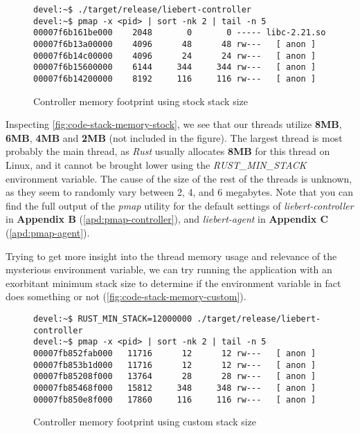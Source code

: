            \begin{figure}[!htb]
                \centering
                \begin{BVerbatim}
devel:~$ ./target/release/liebert-controller
devel:~$ pmap -x <pid> | sort -nk 2 | tail -n 5
00007f6b161be000    2048       0       0 ----- libc-2.21.so
00007f6b13a00000    4096      48      48 rw---   [ anon ]
00007f6b14c00000    4096      24      24 rw---   [ anon ]
00007f6b15600000    6144     344     344 rw---   [ anon ]
00007f6b14200000    8192     116     116 rw---   [ anon ]
                \end{BVerbatim}
                \caption{Controller memory footprint using stock stack size}
                \label{fig:code-stack-memory-stock}
            \end{figure}
            
            Inspecting \autoref{fig:code-stack-memory-stock}, we see that our threads utilize \textbf{8MB}, \textbf{6MB}, \textbf{4MB} and \textbf{2MB} (not included in the figure). The largest thread is most probably the main thread, as \textit{Rust} usually allocates \textbf{8MB} for this thread on Linux, and it cannot be brought lower using the \textit{RUST\_MIN\_STACK} environment variable. The cause of the size of the rest of the threads is unknown, as they seem to randomly vary between 2, 4, and 6 megabytes. Note that you can find the full output of the \textit{pmap} utility for the default settings of \textit{liebert-controller} in \textbf{Appendix B} (\autoref{apd:pmap-controller}), and \textit{liebert-agent} in \textbf{Appendix C} (\autoref{apd:pmap-agent}).
            
            Trying to get more insight into the thread memory usage and relevance of the mysterious environment variable, we can try running the application with an exorbitant minimum stack size to determine if the environment variable in fact does something or not (\autoref{fig:code-stack-memory-custom}).
            
            \begin{figure}[!htb]
                \centering
                \begin{BVerbatim}
devel:~$ RUST_MIN_STACK=12000000 ./target/release/liebert-controller
devel:~$ pmap -x <pid> | sort -nk 2 | tail -n 5
00007fb852fab000   11716      12      12 rw---   [ anon ]
00007fb853b1d000   11716      12      12 rw---   [ anon ]
00007fb85208f000   13764      28      28 rw---   [ anon ]
00007fb85468f000   15812     348     348 rw---   [ anon ]
00007fb850e8f000   17860     116     116 rw---   [ anon ]
                \end{BVerbatim}
                \caption{Controller memory footprint using custom stack size}
                \label{fig:code-stack-memory-custom}
            \end{figure}
            
